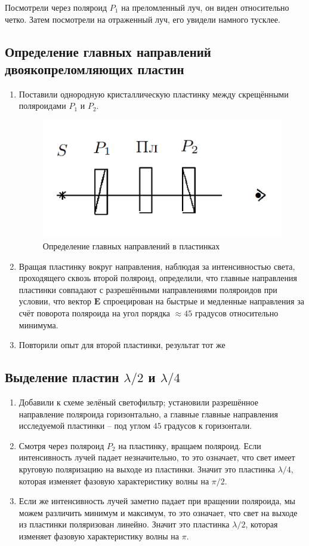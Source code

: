 \documentclass[a4paper,12pt]{article}
\begin{document}
Посмотрели через поляроид $P_1$ на преломленный луч, он виден относительно четко. Затем посмотрели на отраженный луч, его увидели намного тусклее.

\subsection{Определение главных направлений двоякопреломляющих пластин}

\begin{enumerate}
    \item Поставили однородную кристаллическую пластинку между скрещёнными поляроидами $P_1$ и $P_2$.
    
    \begin{figure}[h]
    \centering
    \includegraphics[width=0.4\linewidth]{img6.png}
    \caption{Определение главных направлений в пластинках}
    \label{img6}
    \end{figure}
    
    \item Вращая пластинку вокруг направления, наблюдая за интенсивностью света, проходящего сквозь второй поляроид, определили, что главные направления пластинки совпадают с разрешёнными направлениями поляроидов при условии, что вектор $\mathbf{E}$ спроецирован на быстрые и медленные направления за счёт поворота поляроида на угол порядка $\approx45$ градусов относительно минимума.
    
    \item Повторили опыт для второй пластинки, результат тот же
\end{enumerate}

\subsection{Выделение пластин $\lambda/2$ и $\lambda/4$}

\begin{enumerate}
    \item Добавили к схеме зелёный светофильтр; установили разрешённое направление поляроида горизонтально, а главные главные направления исследуемой пластинки -- под углом $45$ градусов к горизонтали.
    
    \item Смотря через поляроид $P_2$ на пластинку, вращаем поляроид. Если интенсивность лучей падает незначительно, то это означает, что свет имеет круговую поляризацию на выходе из пластинки. Значит это пластинка $\lambda/4$, которая изменяет фазовую характеристику волны на $\pi/2$.

    \item Если же интенсивность лучей заметно падает при вращении поляроида, мы можем различить минимум и максимум, то это означает, что свет на выходе из пластинки поляризован линейно. Значит это пластинка $\lambda/2$, которая изменяет фазовую характеристику волны на $\pi$.
\end{enumerate}
\end{document}
